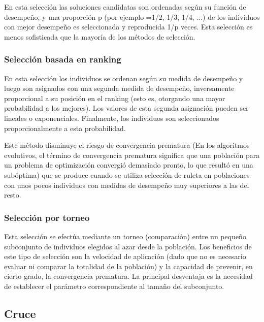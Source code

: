 En esta selección las soluciones candidatas son ordenadas según su función de desempeño, y una proporción p (por ejemplo =1/2, 1/3, 1/4, ...) de los individuos con mejor desempeño es seleccionada y reproducida 1/p veces. Esta selección es menos
sofisticada que la mayoría de los métodos de selección.


\subsubsection{Selección basada en ranking}

En esta selección los individuos se ordenan según su medida de desempeño y luego son asignados con una segunda medida de desempeño, inversamente proporcional a su posición en el ranking (esto es, otorgando una mayor probabilidad a los mejores). Los valores de esta segunda asignación pueden ser lineales o exponenciales. Finalmente, los individuos son seleccionados proporcionalmente a esta probabilidad. 

Este método disminuye el riesgo de convergencia prematura (En los algoritmos evolutivos, el término de convergencia prematura significa que una población para un problema de optimización convergió demasiado pronto, lo que resultó en una subóptima) que se produce cuando se utiliza selección de ruleta en poblaciones con unos pocos individuos con medidas de desempeño muy superiores a las del resto.



\subsubsection{Selección por torneo}
Esta selección se efectúa mediante un torneo (comparación) entre un pequeño subconjunto de individuos elegidos al azar desde la población. Los beneficios de este tipo de selección son la velocidad de aplicación (dado que no es necesario evaluar ni comparar la totalidad de la población) y la capacidad de prevenir, en cierto grado, la convergencia prematura. La principal desventaja es la necesidad de establecer el parámetro correspondiente al tamaño del subconjunto.

\label{sec:MachineLearning}


\subsection{Cruce}

